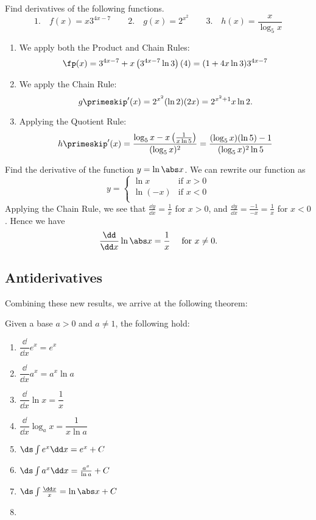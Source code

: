 \begin{example}\label{ex_find_d_exp_log}
Find derivatives of the following functions.
\[
 \text{1.}\quad f(x)=x3^{4x-7}\qquad
 \text{2.}\quad g(x)=2^{x^2}\qquad
 \text{3.}\quad h(x)=\frac x{\log_5x}
\]
\solution
\begin{enumerate}
\item We apply both the Product and Chain Rules:
\[\fp(x)=3^{4x-7}+x\left(3^{4x-7}\ln 3\right)(4)=(1+4x\ln 3)3^{4x-7}\]
\item We apply the Chain Rule:
\[g\primeskip'(x)=2^{x^2}(\ln 2)(2x)=2^{x^2+1}x\ln2.\]
\item Applying the Quotient Rule:
\[h\primeskip'(x)=\frac{\log_5x-x\left(\frac1{x\ln 5}\right)}{(\log_5x)^2}=\frac{(\log_5x)(\ln 5)-1}{(\log_5x)^2\ln 5}\]
\end{enumerate}
\end{example}

\begin{example}\label{ex_d_ln_abs_x}
Find the derivative of the function $y=\ln\abs x$.
\solution
We can rewrite our function as
\[y=\begin{cases} \ln x & \text{if $x>0$}\\ \ln(-x) & \text{if $x<0$}\\ \end{cases}\]
Applying the Chain Rule, we see that $\frac{\dd y}{\dd x}=\frac 1x$ for $x>0$, and $\frac{\dd y}{\dd x}=\frac{-1}{-x}=\frac 1x$ for $x<0$. Hence we have
\[\frac{\dd}{\dd x}\ln\abs x=\frac 1x \quad\text{ for $x\neq0$.}\]
\end{example}

\subsection{Antiderivatives}

Combining these new results, we arrive at the following theorem:

\begin{theorem}\label{thm_int_exp_log}
Given a base $a>0$ and $a\neq 1$, the following hold:\\[-1.5\baselineskip]
\begin{multicols}{2}
\begin{enumerate}
\item $\dfrac\dd{\dd x}e^x=e^x$
\item $\dfrac\dd{\dd x}a^x=a^x\ln a$
\item $\dfrac\dd{\dd x}\ln x=\dfrac1x$
\item $\dfrac\dd{\dd x}\log_a x=\dfrac1{x\ln a}$
\item $\ds\int e^x\dd x=e^x+C$
\item $\ds\int a^x\dd x=\frac{a^x}{\ln a}+C$
\item $\ds\int \frac{\dd x}{x}=\ln\abs x+C$
\item[]
\end{enumerate}
\end{multicols}
\end{theorem}

